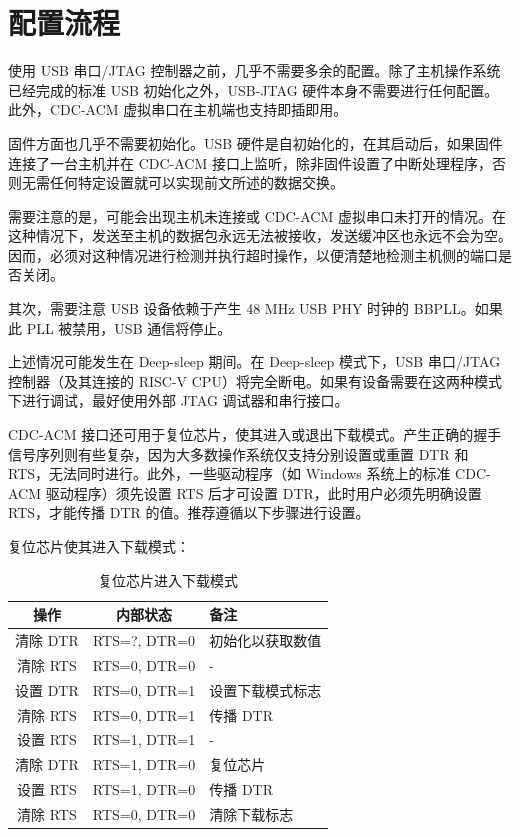 \documentclass[main\_\_CN.tex]{subfiles}
\begin{document}
\section{配置流程}
\label{sec:usbserialjtag-recommended-operation}

使用 USB 串口/JTAG 控制器之前，几乎不需要多余的配置。除了主机操作系统已经完成的标准 USB 初始化之外，USB-JTAG 硬件本身不需要进行任何配置。此外，CDC-ACM 虚拟串口在主机端也支持即插即用。

固件方面也几乎不需要初始化。USB 硬件是自初始化的，在其启动后，如果固件连接了一台主机并在 CDC-ACM 接口上监听，除非固件设置了中断处理程序，否则无需任何特定设置就可以实现前文所述的数据交换。

需要注意的是，可能会出现主机未连接或 CDC-ACM 虚拟串口未打开的情况。在这种情况下，发送至主机的数据包永远无法被接收，发送缓冲区也永远不会为空。因而，必须对这种情况进行检测并执行超时操作，以便清楚地检测主机侧的端口是否关闭。

其次，需要注意 USB 设备依赖于产生 48 MHz USB PHY 时钟的 BBPLL。如果此 PLL 被禁用，USB 通信将停止。

上述情况可能发生在 Deep-sleep 期间。在 Deep-sleep 模式下，USB 串口/JTAG 控制器（及其连接的 RISC-V CPU）将完全断电。如果有设备需要在这两种模式下进行调试，最好使用外部 JTAG 调试器和串行接口。

CDC-ACM 接口还可用于复位芯片，使其进入或退出下载模式。产生正确的握手信号序列则有些复杂，因为大多数操作系统仅支持分别设置或重置 DTR 和 RTS，无法同时进行。此外，一些驱动程序（如 Windows 系统上的标准 CDC-ACM 驱动程序）须先设置 RTS 后才可设置 DTR，此时用户必须先明确设置 RTS，才能传播 DTR 的值。推荐遵循以下步骤进行设置。

复位芯片使其进入下载模式：

\begin{table}[H]
\centering
\caption{复位芯片进入下载模式}
\label{tab:usbserialjtag-reset-soc-into-download-mode}

\begin{tabular} {|c|c|l|}\hline
\rowcolor{lightgray}
\textbf{操作} & \textbf{内部状态} & \textbf{备注} \\\hline

清除 DTR & RTS=?, DTR=0 & 初始化以获取数值 \\\hline
清除 RTS & RTS=0, DTR=0 & - \\\hline
设置 DTR & RTS=0, DTR=1 & 设置下载模式标志 \\\hline
清除 RTS & RTS=0, DTR=1 & 传播 DTR \\\hline
设置 RTS & RTS=1, DTR=1 & - \\\hline
清除 DTR & RTS=1, DTR=0 & 复位芯片 \\\hline
设置 RTS & RTS=1, DTR=0 & 传播 DTR \\\hline
清除 RTS & RTS=0, DTR=0 & 清除下载标志\\\hline
\end{tabular}
\end{table}
\end{document}
